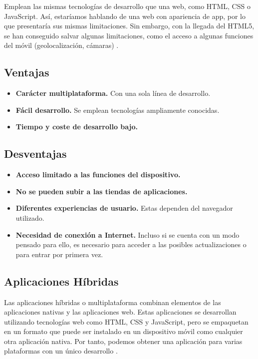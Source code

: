Emplean las mismas tecnologías de desarrollo que una web, como HTML, CSS o JavaScript. Así, estaríamos hablando de una web con apariencia de app, por lo que presentaría sus mismas limitaciones. Sin embargo, con la llegada del HTML5, se han conseguido salvar algunas limitaciones, como el acceso a algunas funciones del móvil (geolocalización, cámaras) \cite{IM1}.

\subsection*{Ventajas}
\begin{itemize}
	\item \textbf{Carácter multiplataforma.} Con una sola línea de desarrollo.
	\item \textbf{Fácil desarrollo.} Se emplean tecnologías ampliamente conocidas.
	\item \textbf{Tiempo y coste de desarrollo bajo.}
\end{itemize}

\subsection*{Desventajas}
\begin{itemize}
	\item \textbf{Acceso limitado a las funciones del dispositivo.}
	\item \textbf{No se pueden subir a las tiendas de aplicaciones.}
	\item \textbf{Diferentes experiencias de usuario.} Estas dependen del navegador utilizado.
	\item \textbf{Necesidad de conexión a Internet.} Incluso si se cuenta con un modo pensado para ello, es necesario para acceder a las posibles actualizaciones o para entrar por primera vez.
\end{itemize}

\subsection{Aplicaciones Híbridas}
Las aplicaciones híbridas o multiplataforma combinan elementos de las aplicaciones nativas y las aplicaciones web. Estas aplicaciones se desarrollan utilizando tecnologías web como HTML, CSS y JavaScript, pero se empaquetan en un formato que puede ser instalado en un dispositivo móvil como cualquier otra aplicación nativa. Por tanto, podemos obtener una aplicación para varias plataformas con un único desarrollo \cite{IM1}.

